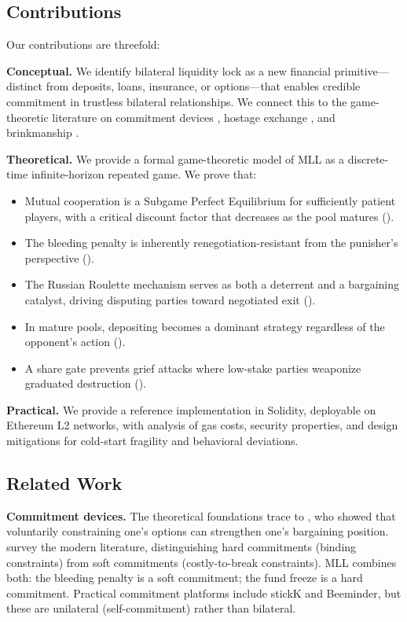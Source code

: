 \documentclass[12pt,a4paper]{article}
\begin{document}
\subsection{Contributions}

Our contributions are threefold:

\textbf{Conceptual.} We identify bilateral liquidity lock as a new financial primitive---distinct from deposits, loans, insurance, or options---that enables credible commitment in trustless bilateral relationships. We connect this to the game-theoretic literature on commitment devices \citep{bryan2010}, hostage exchange \citep{williamson1983}, and brinkmanship \citep{schelling1960,powell1988}.

\textbf{Theoretical.} We provide a formal game-theoretic model of MLL as a discrete-time infinite-horizon repeated game. We prove that:
\begin{itemize}
  \item Mutual cooperation is a Subgame Perfect Equilibrium for sufficiently patient players, with a critical discount factor that decreases as the pool matures ().
  \item The bleeding penalty is inherently renegotiation-resistant from the punisher's perspective ().
  \item The Russian Roulette mechanism serves as both a deterrent and a bargaining catalyst, driving disputing parties toward negotiated exit ().
  \item In mature pools, depositing becomes a dominant strategy regardless of the opponent's action ().
  \item A share gate prevents grief attacks where low-stake parties weaponize graduated destruction ().
\end{itemize}

\textbf{Practical.} We provide a reference implementation in Solidity, deployable on Ethereum L2 networks, with analysis of gas costs, security properties, and design mitigations for cold-start fragility and behavioral deviations.

\subsection{Related Work}
\label{sec:related}

\textbf{Commitment devices.} The theoretical foundations trace to \citet{schelling1960}, who showed that voluntarily constraining one's options can strengthen one's bargaining position. \citet{bryan2010} survey the modern literature, distinguishing hard commitments (binding constraints) from soft commitments (costly-to-break constraints). MLL combines both: the bleeding penalty is a soft commitment; the fund freeze is a hard commitment. Practical commitment platforms include stickK \citep{karlan2014} and Beeminder, but these are unilateral (self-commitment) rather than bilateral.
\end{document}
